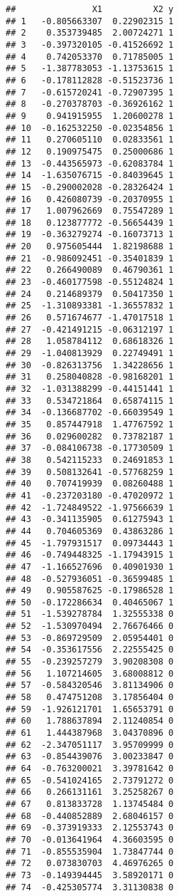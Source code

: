 \documentclass[
]{article}
\begin{document}
\begin{verbatim}
##               X1          X2 y
## 1   -0.805663307  0.22902315 1
## 2    0.353739485  2.00724271 1
## 3   -0.397320105 -0.41526692 1
## 4    0.742053370  0.71785005 1
## 5   -1.387783053 -1.13753615 1
## 6   -0.178112828 -0.51523736 1
## 7   -0.615720241 -0.72907395 1
## 8   -0.270378703 -0.36926162 1
## 9    0.941915955  1.20600278 1
## 10  -0.162532250 -0.02354856 1
## 11   0.270605110  0.02833561 1
## 12   0.190975475  0.25000686 1
## 13  -0.443565973 -0.62083784 1
## 14  -1.635076715 -0.84039645 1
## 15  -0.290002028 -0.28326424 1
## 16   0.426080739 -0.20370955 1
## 17   1.007962669  0.75547289 1
## 18   0.123877772 -0.56654439 1
## 19  -0.363279274 -0.16073713 1
## 20   0.975605444  1.82198688 1
## 21  -0.986092451 -0.35401839 1
## 22   0.266490089  0.46790361 1
## 23  -0.460177598 -0.55124824 1
## 24   0.214689379  0.50417350 1
## 25  -1.310893381 -1.36557832 1
## 26   0.571674677 -1.47017518 1
## 27  -0.421491215 -0.06312197 1
## 28   1.058784112  0.68618326 1
## 29  -1.040813929  0.22749491 1
## 30  -0.826313756  1.34228656 1
## 31   0.258040828 -0.98168201 1
## 32  -1.031388299 -0.44151441 1
## 33   0.534721864  0.65874115 1
## 34  -0.136687702 -0.66039549 1
## 35   0.857447918  1.47767592 1
## 36   0.029600282  0.73782187 1
## 37  -0.084106738 -0.17730509 1
## 38   0.542115233  0.24691853 1
## 39   0.508132641 -0.57768259 1
## 40   0.707419939  0.08260488 1
## 41  -0.237203180 -0.47020972 1
## 42  -1.724849522 -1.97566639 1
## 43  -0.341135905  0.61275943 1
## 44   0.704605369  0.43863286 1
## 45  -1.797931517  0.09734443 1
## 46  -0.749448325 -1.17943915 1
## 47  -1.166527696  0.40901930 1
## 48  -0.527936051 -0.36599485 1
## 49   0.905587625 -0.17986528 1
## 50  -0.172286634  0.40465067 1
## 51  -1.539278784  1.32555338 0
## 52  -1.530970494  2.76676466 0
## 53  -0.869729509  2.05954401 0
## 54  -0.353617556  2.22555425 0
## 55  -0.239257279  3.90208308 0
## 56   1.107214605  3.68008812 0
## 57  -0.584320546  3.81134906 0
## 58   0.474751208  3.17856404 0
## 59  -1.926121701  1.65653791 0
## 60   1.788637894  2.11240854 0
## 61   1.444387968  3.04370896 0
## 62  -2.347051117  3.95709999 0
## 63  -0.854439076  3.00233847 0
## 64  -0.763200021  3.39781642 0
## 65  -0.541024165  2.73791272 0
## 66   0.266131161  3.25258267 0
## 67   0.813833728  1.13745484 0
## 68  -0.440852889  2.68046157 0
## 69  -0.373919333  2.12553743 0
## 70  -0.013641964  4.36603595 0
## 71  -0.855535904  1.73847744 0
## 72   0.073830703  4.46976265 0
## 73  -0.149394445  3.58920171 0
## 74  -0.425305774  3.31130838 0

\end{verbatim}
\end{document}
